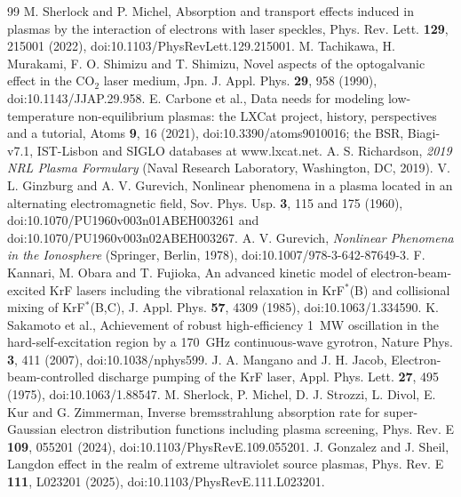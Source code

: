 \documentclass[11pt]{article}
\numberwithin{equation}{section}
\begin{document}
\begin{thebibliography}{99}
 M. Sherlock and P. Michel, Absorption and transport
effects induced in plasmas by the interaction of electrons with laser speckles,
Phys. Rev. Lett. \textbf{129}, 215001 (2022), doi:10.1103/PhysRevLett.129.215001.
 M. Tachikawa, H. Murakami, F. O. Shimizu and T. Shimizu, Novel
aspects of the optogalvanic effect in the CO$_2$ laser medium, Jpn. J. Appl. Phys.
\textbf{29}, 958 (1990), doi:10.1143/JJAP.29.958.
 E. Carbone et al., Data needs for modeling low-temperature
non-equilibrium plasmas: the LXCat project, history, perspectives and a tutorial, Atoms
\textbf{9}, 16 (2021), doi:10.3390/atoms9010016; the BSR, Biagi-v7.1, IST-Lisbon and
SIGLO databases at www.lxcat.net.
 A. S. Richardson, \emph{2019 NRL Plasma Formulary} (Naval Research
Laboratory, Washington, DC, 2019).
 V. L. Ginzburg and A. V. Gurevich, Nonlinear phenomena
in a plasma located in an alternating electromagnetic field, Sov. Phys. Usp.
\textbf{3}, 115 and 175 (1960), doi:10.1070/PU1960v003n01ABEH003261 and
doi:10.1070/PU1960v003n02ABEH003267.
 A. V. Gurevich, \emph{Nonlinear Phenomena in the Ionosphere}
(Springer, Berlin, 1978), doi:10.1007/978-3-642-87649-3.
 F. Kannari, M. Obara and T. Fujioka, An advanced kinetic model of
electron-beam-excited KrF lasers including the vibrational relaxation in KrF$^*$(B) and
collisional mixing of KrF$^*$(B,C), J. Appl. Phys. \textbf{57}, 4309 (1985),
doi:10.1063/1.334590.
 K. Sakamoto et al., Achievement of robust high-efficiency 1~MW
oscillation in the hard-self-excitation region by a 170~GHz continuous-wave gyrotron,
Nature Phys. \textbf{3}, 411 (2007), doi:10.1038/nphys599.
 J. A. Mangano and J. H. Jacob, Electron-beam-controlled
discharge pumping of the KrF laser, Appl. Phys. Lett. \textbf{27}, 495 (1975),
doi:10.1063/1.88547.
 M. Sherlock, P. Michel, D. J. Strozzi, L. Divol, E. Kur and
G. Zimmerman, Inverse bremsstrahlung absorption rate for super-Gaussian electron
distribution functions including plasma screening, Phys. Rev. E \textbf{109}, 055201
(2024), doi:10.1103/PhysRevE.109.055201.
 J. Gonzalez and J. Sheil, Langdon effect in the realm of
extreme ultraviolet source plasmas, Phys. Rev. E \textbf{111}, L023201 (2025),
doi:10.1103/PhysRevE.111.L023201.
\end{thebibliography}
\end{document}
